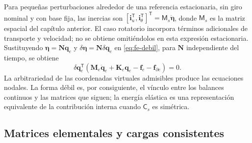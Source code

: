 \documentclass[11pt,a4paper,oneside]{report}
\newcommand{\vct}[1]{\bm{#1}}
\newcommand{\ten}[1]{\boldsymbol{#1}}
\newcommand{\tr}{\mathsf T}
\begin{document}
Para pequeñas perturbaciones alrededor de una referencia estacionaria, sin
giro nominal y con base fija, las inercias son
$[\vct i_u^{\tr},\vct i_\theta^{\tr}]^{\tr}
=\mathsf M_s\ddot{\vct\eta}$, donde $\mathsf M_s$ es la matriz espacial del
capítulo anterior. El caso rotatorio incorpora términos adicionales de
transporte y velocidad; no se obtiene omitiéndolos en esta expresión
estacionaria. Sustituyendo $\vct\eta=\ten N\vct q_e$ y
$\delta\vct\eta=\ten N\delta\vct q_e$ en \eqref{eq:fe-debil}, para
$\ten N$ independiente del tiempo, se obtiene
\begin{equation}
 \delta\vct q_e^{\tr}
 (\ten M_e\ddot{\vct q}_e+\ten K_e\vct q_e
       -\vct f_e-\vct f_{\partial e})=0.
\end{equation}
La arbitrariedad de las coordenadas virtuales admisibles produce las
ecuaciones nodales. La forma débil es, por consiguiente, el vínculo entre los
balances continuos y las matrices que siguen; la energía elástica es una
representación equivalente de la contribución interna cuando
$\mathsf C_s$ es simétrica.

\subsection{Matrices elementales y cargas consistentes}
\end{document}

